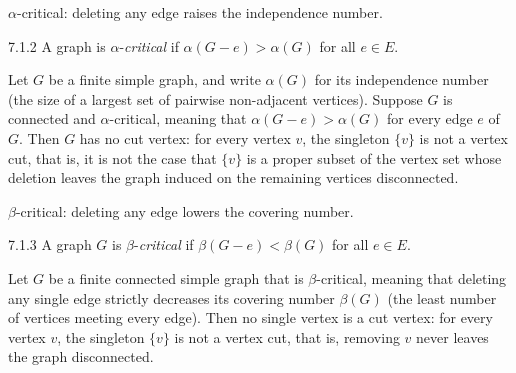 \begin{definition}
\label{SimpleGraph.IsAlphaCritical}
\leanok
$\alpha$-critical: deleting any edge raises the independence number.

7.1.2   A graph is $\alpha$-\emph{critical} if $\alpha(G - e) > \alpha(G)$ for
all $e \in E$.
\end{definition}

\begin{theorem}
\label{SimpleGraph.no_cutVertex_of_isAlphaCritical}
Let $G$ be a finite simple graph, and write $\alpha(G)$ for its independence number (the
size of a largest set of pairwise non-adjacent vertices). Suppose $G$ is connected and
$\alpha$-critical, meaning that $\alpha(G - e) > \alpha(G)$ for every edge $e$ of $G$.
Then $G$ has no cut vertex: for every vertex $v$, the singleton $\{v\}$ is not a vertex
cut, that is, it is not the case that $\{v\}$ is a proper subset of the vertex set whose
deletion leaves the graph induced on the remaining vertices disconnected.
\end{theorem}

\begin{definition}
\label{SimpleGraph.IsBetaCritical}
\leanok
{}
$\beta$-critical: deleting any edge lowers the covering number.

7.1.3   A graph $G$ is $\beta$-\emph{critical} if $\beta(G - e) < \beta(G)$ for
all $e \in E$.
\end{definition}

\begin{theorem}
\label{SimpleGraph.no_cutVertex_of_isBetaCritical}
Let $G$ be a finite connected simple graph that is $\beta$-critical, meaning that
deleting any single edge strictly decreases its covering number $\beta(G)$ (the least
number of vertices meeting every edge). Then no single vertex is a cut vertex: for every
vertex $v$, the singleton $\{v\}$ is not a vertex cut, that is, removing $v$ never
leaves the graph disconnected.
\end{theorem}

